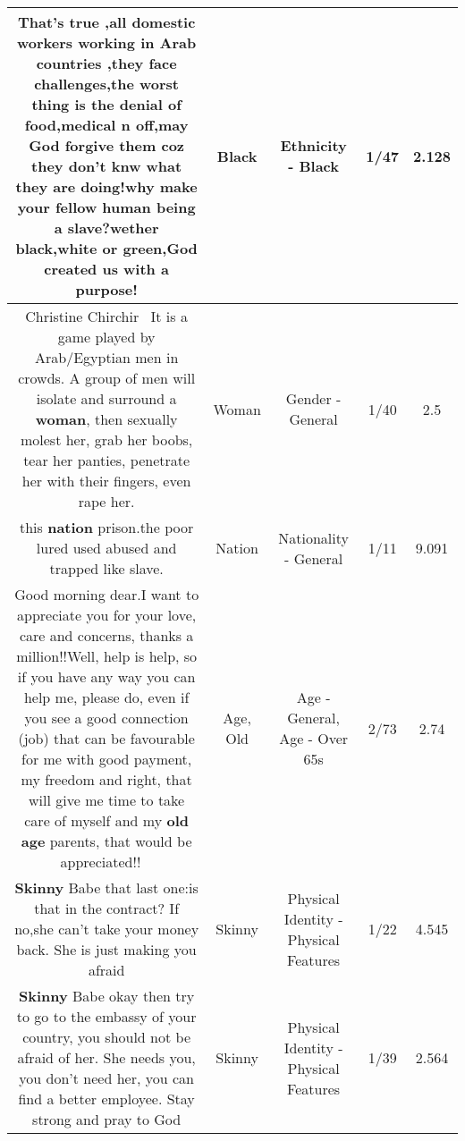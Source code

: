 \documentclass[11pt]{article}
\newlength\mylength
\begin{document}
\begin{center}
\begin{longtable}{|C{.65\mylength}|C{.30\mylength}|C{.12\mylength}|C{.12\mylength}|C{.12\mylength}|}
  \small That's true ,all domestic workers working in Arab countries ,they face challenges,the worst thing is the denial of food,medical n off,may God forgive them coz they don't knw what they are doing!why make your fellow human being a slave?wether \textbf{black},white or green,God created us with a purpose!\normalsize   & Black & Ethnicity - Black & 1/47 & 2.128 \\  \hline
  \small Christine Chirchir  It is a game played by Arab/Egyptian men in crowds. A group of men will isolate and surround a \textbf{woman}, then sexually molest her, grab her boobs, tear her panties, penetrate her with their fingers, even rape her.\normalsize   & Woman & Gender - General & 1/40 & 2.5 \\  \hline
  \small this \textbf{nation} prison.the poor lured used abused and trapped like slave.\normalsize   & Nation & Nationality - General & 1/11 & 9.091 \\  \hline
  \small Good morning dear.I want to appreciate you for your love, care and concerns, thanks a million!!Well, help is help, so if you have any way you can help me, please do, even if you see a good connection (job) that can be favourable for me with good payment, my freedom and right, that will give me time to take care of myself and my \textbf{old} \textbf{age} parents, that would be appreciated!!🙏🙏🙏\normalsize   & Age, Old & Age - General, Age - Over 65s & 2/73 & 2.74 \\  \hline
  \small \@\textbf{Skinny} Babe  that last one:is that in the contract? If no,she can't take your money back. She is just making you afraid\normalsize   & Skinny & Physical Identity - Physical Features & 1/22 & 4.545 \\  \hline
  \small \@\textbf{Skinny} Babe okay then try to go to the embassy of your country, you should not be afraid of her. She needs you, you don't need her, you can find a better employee. Stay strong and pray to God\normalsize   & Skinny & Physical Identity - Physical Features & 1/39 & 2.564 \\  \hline

\end{longtable}
\end{center}
\end{document}

